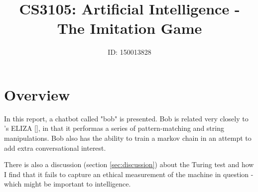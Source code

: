 \documentclass[]{article}
\title{CS3105: Artificial Intelligence - The Imitation Game}
\author{ID: 150013828}
\begin{document}
\maketitle


\section{Overview} In this report, a chatbot called "bob" is presented. Bob is related very closely to \citeauthor{Weizenbaum}'s ELIZA [], in that it performas a series of pattern-matching and string manipulations. Bob also has the ability to train a markov chain in an attempt to add extra conversational interest.

There is also a discussion (section \ref{sec:discussion}) about the Turing test and how I find that it fails to capture an ethical measurement of the machine in question - which might be important to intelligence.
\end{document}
